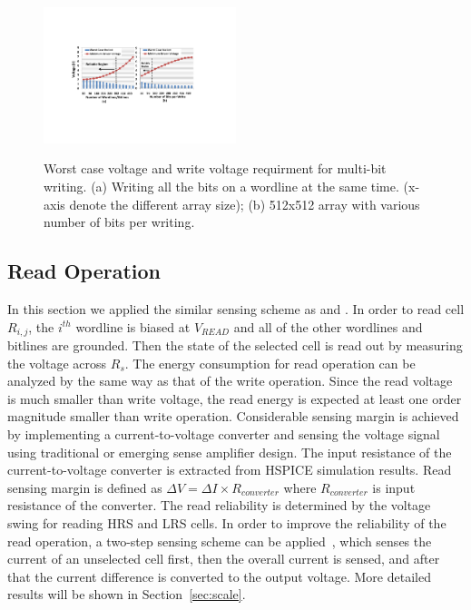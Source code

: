 \begin{figure}%
\centering\label{fig:multiV}
  \includegraphics[width=0.5\textwidth]{./figures/multi_V.pdf}\\
  \caption{Worst case voltage and write voltage requirment for multi-bit writing. (a) Writing all the bits on a wordline at the same time. (x-axis denote the different array size); (b) 512x512 array with various number of bits per writing.}\label{fig:reliable_region}
    \vspace{-10pt}
\end{figure}
\subsection{Read Operation}
In this section we applied the similar sensing scheme as
\cite{crossbar_TED_2010} and \cite{crossbar_NANO08_Flocke}. In order to
read cell $R_{i,j}$, the $i^{th}$ wordline is biased at $V_{READ}$ and all
of the other wordlines and bitlines are grounded. Then the state of the
selected cell is read out by measuring the voltage across $R_s$. The
energy consumption for read operation can be analyzed by the same way as
that of the write operation. Since the read voltage is much smaller than
write voltage, the read energy is expected at least one order magnitude
smaller than write operation. Considerable sensing margin is achieved by
implementing a current-to-voltage converter and sensing the voltage signal
using traditional or emerging sense amplifier design. The input resistance
of the current-to-voltage converter is extracted from HSPICE simulation
results. Read sensing margin is defined as $\Delta V = \Delta I \times
R_{converter}$ where $R_{converter}$ is input resistance of the converter.
The read reliability is determined by the voltage swing for reading HRS
and LRS cells. In order to improve the reliability of the read operation,
a two-step sensing scheme can be applied~\cite{memristor:Cong}, which
senses the current of an unselected cell first, then the overall current
is sensed, and after that the current difference is converted to the
output voltage. More detailed results will be shown in
Section~\ref{sec:scale}.

